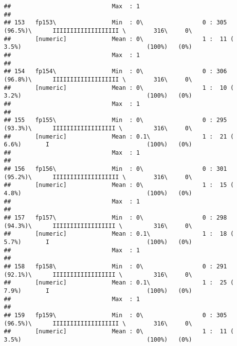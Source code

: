 \documentclass[]{article}
\begin{document}
\begin{verbatim}
##                             Max  : 1                                                                                       
## 
## 153   fp153\                Min  : 0\                 0 : 305 (96.5%)\      IIIIIIIIIIIIIIIIIII \        316\     0\       
##       [numeric]             Mean : 0\                 1 :  11 ( 3.5%)                                    (100%)   (0%)     
##                             Max  : 1                                                                                       
## 
## 154   fp154\                Min  : 0\                 0 : 306 (96.8%)\      IIIIIIIIIIIIIIIIIII \        316\     0\       
##       [numeric]             Mean : 0\                 1 :  10 ( 3.2%)                                    (100%)   (0%)     
##                             Max  : 1                                                                                       
## 
## 155   fp155\                Min  : 0\                 0 : 295 (93.3%)\      IIIIIIIIIIIIIIIIII \         316\     0\       
##       [numeric]             Mean : 0.1\               1 :  21 ( 6.6%)       I                            (100%)   (0%)     
##                             Max  : 1                                                                                       
## 
## 156   fp156\                Min  : 0\                 0 : 301 (95.2%)\      IIIIIIIIIIIIIIIIIII \        316\     0\       
##       [numeric]             Mean : 0\                 1 :  15 ( 4.8%)                                    (100%)   (0%)     
##                             Max  : 1                                                                                       
## 
## 157   fp157\                Min  : 0\                 0 : 298 (94.3%)\      IIIIIIIIIIIIIIIIII \         316\     0\       
##       [numeric]             Mean : 0.1\               1 :  18 ( 5.7%)       I                            (100%)   (0%)     
##                             Max  : 1                                                                                       
## 
## 158   fp158\                Min  : 0\                 0 : 291 (92.1%)\      IIIIIIIIIIIIIIIIII \         316\     0\       
##       [numeric]             Mean : 0.1\               1 :  25 ( 7.9%)       I                            (100%)   (0%)     
##                             Max  : 1                                                                                       
## 
## 159   fp159\                Min  : 0\                 0 : 305 (96.5%)\      IIIIIIIIIIIIIIIIIII \        316\     0\       
##       [numeric]             Mean : 0\                 1 :  11 ( 3.5%)                                    (100%)   (0%)     

\end{verbatim}
\end{document}
